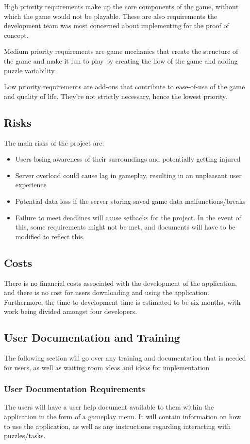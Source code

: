 \documentclass[12pt]{article}
\begin{document}
High priority requirements make up the core components of the game, without which the game would not be playable. These are also requirements the development team was most concerned about implementing for the proof of concept.

Medium priority requirements are game mechanics that create the structure of the game and make it fun to play by creating the flow of the game and adding puzzle variability.

Low priority requirements are add-ons that contribute to ease-of-use of the game and quality of life. They're not strictly necessary, hence the lowest priority.

\subsection{Risks}
The main risks of the project are:
\begin{itemize}
    \item Users losing awareness of their surroundings and potentially getting injured
    \item Server overload could cause lag in gameplay, resulting in an unpleasant user experience
    \item Potential data loss if the server storing saved game data malfunctions/breaks
    \item Failure to meet deadlines will cause setbacks for the project. In the event of this, some requirements might not be met, and documents will have to be modified to reflect this. 
\end{itemize}

\subsection{Costs}
There is no financial costs associated with the development of the application, and there is no cost for users downloading and using the application. Furthermore, the time to development time is estimated to be six months, with work being divided amongst four developers.

\subsection{User Documentation and Training}
The following section will go over any training and documentation that is needed for users, as well as waiting room ideas and ideas for implementation
\subsubsection{User Documentation Requirements}
The users will have a user help document available to them within the application in the form of a gameplay menu. It will contain information on how to use the application, as well as any instructions regarding interacting with puzzles/tasks.
\end{document}
